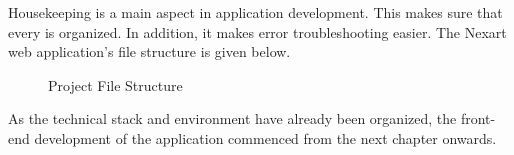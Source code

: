 \documentclass[a4Paper,12pt]{report}
\begin{document}
Housekeeping is a main aspect in application development. This makes sure that every is organized. In addition, it makes error troubleshooting easier. The Nexart web application’s file structure is given below.
\begin{figure}[H]
\centering
{}
\caption{Project File Structure}
\end{figure}
As the technical stack and environment have already been organized, the front-end development of the application commenced from the next chapter onwards.
\end{document}
